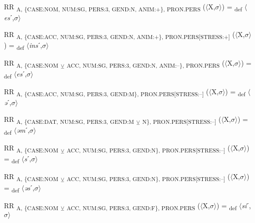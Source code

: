 {\begin{exe}
 RR \textsubscript{A, \{CASE:NOM, NUM:SG, PERS:3, GEND:N, ANIM:+\}, PRON.PERS} ($\langle$X,$\sigma $$\rangle$) = \textsubscript{def} $\langle$\textit{es}ˊ,$\sigma $$\rangle$
\end{exe}

\begin{exe}
 RR \textsubscript{A, \{CASE:ACC, NUM:SG, PERS:3, GEND:N, ANIM:+\}, PRON.PERS[STRESS:+]} ($\langle$X,$\sigma $$\rangle$) = \textsubscript{def} $\langle$\textit{ins}ˊ,$\sigma $$\rangle$
\end{exe}

\begin{exe}
 RR \textsubscript{A, \{CASE:NOM} \textsubscript{${\veebar}$}\textsubscript{ ACC, NUM:SG, PERS:3, GEND:N, ANIM:–\}, PRON.PERS} ($\langle$X,$\sigma $$\rangle$) = \textsubscript{def} $\langle$\textit{es}ˊ,$\sigma $$\rangle$
\end{exe}

\begin{exe}
 RR \textsubscript{A, \{CASE:ACC, NUM:SG, PERS:3, GEND:M\}, PRON.PERS[STRESS:–]} ($\langle$X,$\sigma $$\rangle$) = \textsubscript{def} $\langle$\textit{ə}ˊ,$\sigma $$\rangle$
\end{exe}

\begin{exe}
 RR \textsubscript{A, \{CASE:DAT, NUM:SG, PERS:3, GEND:M} \textsubscript{${\veebar}$}\textsubscript{ N\}, PRON.PERS[STRESS:–]} ($\langle$X,$\sigma $$\rangle$) = \textsubscript{def} $\langle$\textit{əm}ˊ,$\sigma $$\rangle$
\end{exe}

\begin{exe}
 RR \textsubscript{A, \{CASE:NOM} \textsubscript{${\veebar}$}\textsubscript{ ACC, NUM:SG, PERS:3, GEND:N\}, PRON.PERS[STRESS:–]} ($\langle$X,$\sigma $$\rangle$) = \textsubscript{def} $\langle$\textit{s}ˊ,$\sigma $$\rangle$
\end{exe}

\begin{exe}
 RR \textsubscript{A, \{CASE:NOM} \textsubscript{${\veebar}$}\textsubscript{ ACC, NUM:SG, PERS:3, GEND:N\}, PRON.PERS[STRESS:–]} ($\langle$X,$\sigma $$\rangle$) = \textsubscript{def} $\langle$\textit{əs}ˊ,$\sigma $$\rangle$
\end{exe}

\begin{exe}
 RR \textsubscript{A, \{CASE:NOM} \textsubscript{${\veebar}$}\textsubscript{ ACC, NUM:SG, PERS:3, GEND:F\}, PRON.PERS} ($\langle$X,$\sigma $$\rangle$) = \textsubscript{def} $\langle$\textit{si}ˊ,$\sigma $$\rangle$
\end{exe}

}
